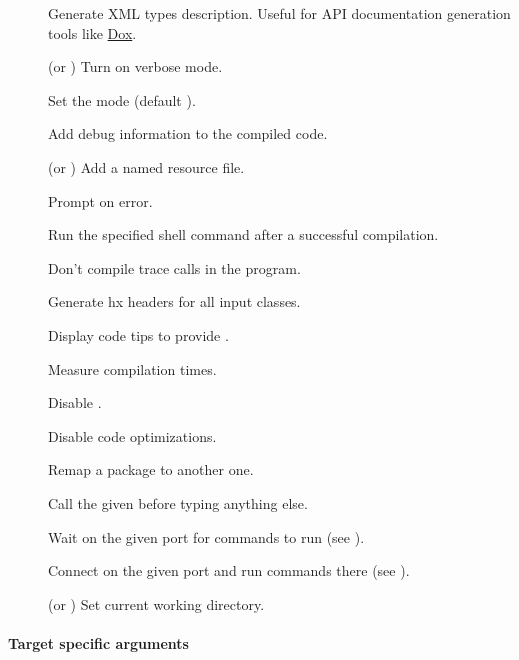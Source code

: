 \begin{description}
	\item[] Generate XML types description. Useful for API documentation generation tools like \href{https://github.com/HaxeFoundation/dox}{Dox}.
	\item[] (or ) Turn on verbose mode.
	\item[] Set the  mode (default ).
	\item[] Add debug information to the compiled code.
	\item[] (or ) Add a named resource file.
	\item[] Prompt on error.
	\item[] Run the specified shell command after a successful compilation.
	\item[] Don't compile trace calls in the program.
	\item[] Generate hx headers for all input classes.
	\item[] Display code tips to provide . 
	\item[] Measure compilation times.
	\item[] Disable .
	\item[] Disable code optimizations.
	\item[] Remap a package to another one.
	\item[] Call the given  before typing anything else.
	\item[] Wait on the given port for commands to run (see ).
	\item[] Connect on the given port and run commands there (see ).
	\item[] (or ) Set current working directory.
\end{description}

\paragraph{Target specific arguments}

